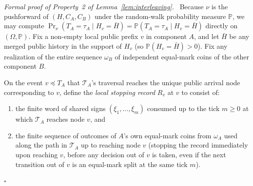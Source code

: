 \documentclass[11pt,letterpaper]{article}
\newenvironment{proof}[1][Proof]{\par\smallskip\noindent\textit{#1.}\ \ignorespaces}{\hfill$\square$\par\medskip}
\begin{document}
\begin{proof}[Formal proof of Property~2 of Lemma~\ref{lem:interleaving}]
Because $\nu$ is the pushforward of $(H,C_A,C_B)$ under the random-walk probability measure $\mathbb P$, we may compute $\Pr_\nu(T_A=\tau_A\mid H_v=\bar H) = \mathbb P(T_A=\tau_A\mid H_v=\bar H)$ directly on $(\Omega,\mathbb P)$. Fix a non-empty local public prefix $v$ in component $A$, and let $\bar H$ be any merged public history in the support of $H_v$ (so $\mathbb P(H_v=\bar H)>0$). Fix any realization of the entire sequence $\omega_B$ of independent equal-mark coins of the other component $B$.

On the event $v\preceq T_A$ that $\mathcal T_A$'s traversal reaches the unique public arrival node corresponding to $v$, define the \emph{local stopping record} $R_v$ at $v$ to consist of:
\begin{enumerate}
\item the finite word of shared signs $(\xi_1,\ldots,\xi_m)$ consumed up to the tick $m\ge 0$ at which $\mathcal T_A$ reaches node $v$, and
\item the finite sequence of outcomes of $A$'s own equal-mark coins from $\omega_A$ used along the path in $\mathcal T_A$ up to reaching node $v$ (stopping the record immediately upon reaching $v$, before any decision out of $v$ is taken, even if the next transition out of $v$ is an equal-mark split at the same tick $m$).
\end{enumerate}


\end{proof}
\end{document}
